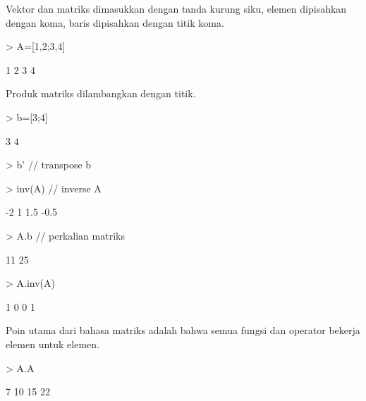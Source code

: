 \documentclass[a4paper,10pt]{article}
\begin{document}
\begin{eulernotebook}
\begin{eulercomment}
\begin{eulercomment}
\begin{eulercomment}
\begin{eulercomment}
\begin{eulercomment}
\begin{eulercomment}
\begin{eulercomment}
Vektor dan matriks dimasukkan dengan tanda kurung siku, elemen
dipisahkan dengan koma, baris dipisahkan dengan titik koma.
\end{eulercomment}
\begin{eulerprompt}
> A=[1,2;3,4]
\end{eulerprompt}
\begin{euleroutput}
              1             2 
              3             4 
\end{euleroutput}
\begin{eulercomment}
Produk matriks dilambangkan dengan titik.
\end{eulercomment}
\begin{eulerprompt}
> b=[3;4]
\end{eulerprompt}
\begin{euleroutput}
              3 
              4 
\end{euleroutput}
\begin{eulerprompt}
> b' // transpose b
\end{eulerprompt}
\begin{euleroutput}
  [3,  4]
\end{euleroutput}
\begin{eulerprompt}
> inv(A) // inverse A
\end{eulerprompt}
\begin{euleroutput}
             -2             1 
            1.5          -0.5 
\end{euleroutput}
\begin{eulerprompt}
> A.b // perkalian matriks
\end{eulerprompt}
\begin{euleroutput}
             11 
             25 
\end{euleroutput}
\begin{eulerprompt}
> A.inv(A)
\end{eulerprompt}
\begin{euleroutput}
              1             0 
              0             1 
\end{euleroutput}
\begin{eulercomment}
Poin utama dari bahasa matriks adalah bahwa semua fungsi dan operator
bekerja elemen untuk elemen.
\end{eulercomment}
\begin{eulerprompt}
> A.A
\end{eulerprompt}
\begin{euleroutput}
              7            10 
             15            22 
\end{euleroutput}

\end{eulercomment}
\end{eulercomment}
\end{eulercomment}
\end{eulercomment}
\end{eulercomment}
\end{eulercomment}
\end{eulernotebook}
\end{document}
